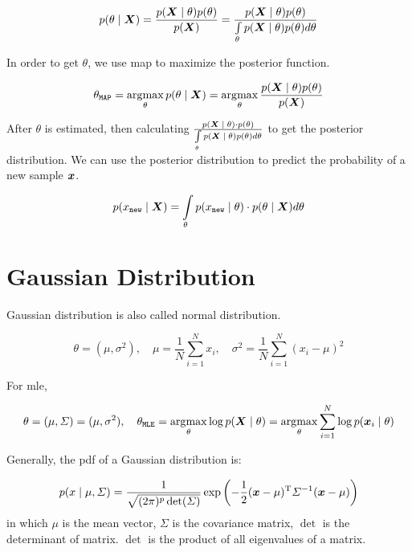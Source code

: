 \begin{equation}
	p\giventhat{\theta}{\vX} = \frac{p\giventhat{\vX}{\theta} p(\theta)}{p(\vX)}  =  \frac{p\giventhat{\vX}{\theta} p(\theta)}{\int\limits_{\theta} p\giventhat{\vX}{\theta} p(\theta) d\theta}
\end{equation}


In order to get \(\theta\), we use \gls{map}  to maximize the posterior function.

\begin{equation}
	\theta_{\mathtt{MAP}} = \argmax_{\theta} p\giventhat{\theta}{\vX} = \argmax_{\theta} \frac{p\giventhat{\vX}{\theta} p(\theta)}{p(\vX)}
\end{equation}


After \(\theta\) is estimated, then  calculating \(\frac{p\giventhat{\vX}{\theta} \cdot p(\theta)}{\int\limits_{\theta} p\giventhat{\vX}{\theta} p(\theta) d\theta}\) to get the posterior distribution.
We can use the posterior distribution to predict the probability of a new sample \(\vx\).

\begin{equation}
	p \giventhat{x_{\mathtt{new}}}{\vX}  = \int\limits_{\theta} p\giventhat{x_{\mathtt{new}}}{\theta} \cdot p\giventhat{\theta}{\vX} d\theta
\end{equation}

\section{Gaussian Distribution}

Gaussian distribution is also called normal distribution.

\begin{equation}
	\theta = (\mu, \sigma^2), \quad \mu = \frac{1}{N} \sum_{i=1}^{N} x_i, \quad \sigma^2 = \frac{1}{N} \sum_{i=1}^{N} (x_i - \mu)^2
\end{equation}

For \gls{mle},

\begin{equation}
	\theta = (\mu, \Sigma) = (\mu, \sigma^2), \quad \theta_{\mathtt{MLE}} = \argmax_{\theta} \log p\giventhat{\vX}{\theta} = \argmax_{\theta} \sum_{i=1}^{N} \log p\giventhat{\vx_i}{\theta}
\end{equation}


Generally, the \gls{pdf} of a Gaussian distribution is:

\begin{equation}
	p\giventhat{x}{\mu, \Sigma} =  \frac{1}{\sqrt{(2\pi)^p \det(\Sigma)}} \exp\left(-\frac{1}{2} (\vx - \mu)\transp \Sigma^{-1} (\vx - \mu)\right)
\end{equation}
in which \(\mu\) is the mean vector, \(\Sigma\) is the covariance matrix, \(\det\) is the determinant of matrix.
\(\det\)  is the product of all eigenvalues of a matrix.

